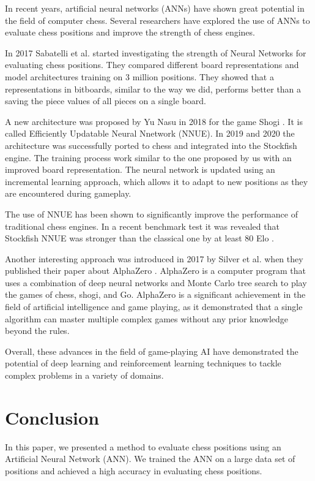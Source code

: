 \documentclass[conference]{IEEEtran}
\begin{document}
In recent years, artificial neural networks (ANNs) have shown great potential in the field of computer chess. Several researchers have explored the use of ANNs to evaluate chess positions and improve the strength of chess engines.

In 2017 Sabatelli et al. \cite{b6} started investigating the strength of Neural Networks for evaluating chess positions. They compared different board representations and model architectures training on 3 million positions. They showed that a representations in bitboards, similar to the way we did, performs better than a saving the piece values of all pieces on a single board.

A new architecture was proposed by Yu Nasu in 2018 for the game Shogi \cite{b7}. It is called Efficiently Updatable Neural Nnetwork (NNUE). In 2019 and 2020 the architecture was successfully ported to chess and integrated into the Stockfish engine. The training process work similar to the one proposed by us with an improved board representation. The neural network is updated using an incremental learning approach, which allows it to adapt to new positions as they are encountered during gameplay.

The use of NNUE has been shown to significantly improve the performance of traditional chess engines. In a recent benchmark test it was revealed that Stockfish NNUE was stronger than the classical one by at least 80 Elo \cite{b8}.

Another interesting approach was introduced in 2017 by Silver et al. when they published their paper about AlphaZero \cite{b9}. AlphaZero is a computer program that uses a combination of deep neural networks and Monte Carlo tree search to play the games of chess, shogi, and Go. AlphaZero is a significant achievement in the field of artificial intelligence and game playing, as it demonstrated that a single algorithm can master multiple complex games without any prior knowledge beyond the rules.

Overall, these advances in the field of game-playing AI have demonstrated the potential of deep learning and reinforcement learning techniques to tackle complex problems in a variety of domains.

\section{Conclusion}\label{conclusion}
In this paper, we presented a method to evaluate chess positions using an Artificial Neural Network (ANN). We trained the ANN on a large data set of positions and achieved a high accuracy in evaluating chess positions.
\end{document}
